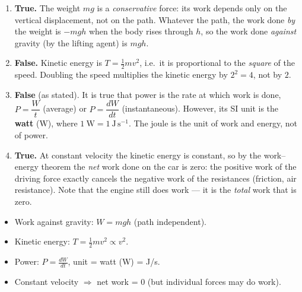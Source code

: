 \documentclass[11pt]{article}
\begin{document}
\begin{corrige}
\begin{enumerate}
\item \textbf{True.} The weight $mg$ is a \emph{conservative} force: its work depends only on the vertical displacement, not on the path. Whatever the path, the work done \emph{by} the weight is $-mgh$ when the body rises through $h$, so the work done \emph{against} gravity (by the lifting agent) is $mgh$.

\item \textbf{False.} Kinetic energy is $T = \tfrac{1}{2}mv^{2}$, i.e.\ it is proportional to the \emph{square} of the speed. Doubling the speed multiplies the kinetic energy by $2^{2} = 4$, not by $2$.

\item \textbf{False} (as stated). It is true that power is the rate at which work is done, $P = \dfrac{W}{t}$ (average) or $P = \dfrac{dW}{dt}$ (instantaneous). However, its SI unit is the \textbf{watt} ($\mathrm{W}$), where $1\ \mathrm{W} = 1\ \mathrm{J\,s^{-1}}$. The joule is the unit of work and energy, not of power.

\item \textbf{True.} At constant velocity the kinetic energy is constant, so by the work--energy theorem the \emph{net} work done on the car is zero: the positive work of the driving force exactly cancels the negative work of the resistances (friction, air resistance). Note that the engine still does work — it is the \emph{total} work that is zero.
\end{enumerate}

\begin{aretenir}
\begin{itemize}
\item Work against gravity: $W = mgh$ (path independent).
\item Kinetic energy: $T = \frac{1}{2}mv^2 \propto v^2$.
\item Power: $P = \frac{dW}{dt}$, unit = watt (W) = J/s.
\item Constant velocity $\Rightarrow$ net work = 0 (but individual forces may do work).
\end{itemize}
\end{aretenir}
\end{corrige}
\end{document}
